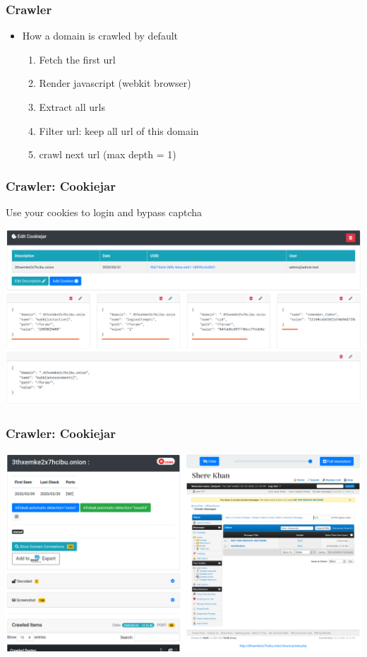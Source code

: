 \documentclass{beamer}
\begin{document}
\begin{frame}
    \frametitle{Crawler}
    \begin{itemize}
    \item[] How a domain is crawled by default
		\begin{enumerate}
		    \item Fetch the first url
            \item Render javascript (webkit browser)
		    \item Extract all urls
		    \item Filter url: keep all url of this domain
		    \item crawl next url (max depth = 1)
		\end{enumerate}
    \end{itemize}
\end{frame}

\begin{frame}
    \frametitle{Crawler: Cookiejar}
    Use your cookies to login and bypass captcha
    \centerline{
        \includegraphics[scale=0.23]{screenshot/crawler-cookiejar-edit.png}
    }
\end{frame}

\begin{frame}
    \frametitle{Crawler: Cookiejar}
    \centerline{
        \includegraphics[scale=0.23]{screenshot/crawler-cookiejar-domain-crawled.png}
    }
\end{frame}
\end{document}
